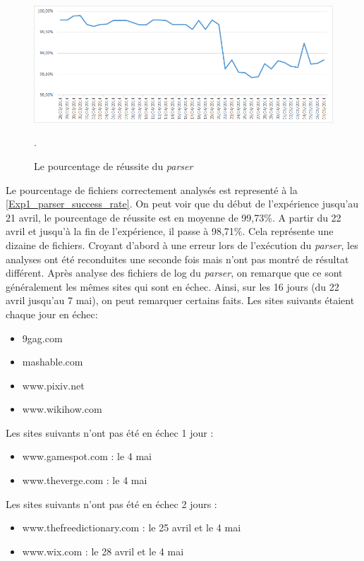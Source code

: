 \begin{figure}[h]
	\centering
	\includegraphics[scale=.8]{graphiques/Exp1_parser_success_rate.png}
	\caption{\label{Exp1_parser_success_rate}Le pourcentage de réussite du \textit{parser}}.
\end{figure}

Le pourcentage de fichiers correctement analysés est representé à la \autoref{Exp1_parser_success_rate}. On peut voir que du début de l'expérience jusqu'au 21 avril, le pourcentage de réussite est en moyenne de 99,73\%. A partir du 22 avril et jusqu'à la fin de l'expérience, il passe à 98,71\%. Cela représente une dizaine de fichiers.
Croyant d'abord à une erreur lors de l'exécution du \textit{parser}, les analyses ont été reconduites une seconde fois mais n'ont pas montré de résultat différent.
Après analyse des fichiers de log du \textit{parser}, on remarque que ce sont généralement les mêmes sites qui sont en échec.
Ainsi, sur les 16 jours (du 22 avril jusqu'au 7 mai), on peut remarquer certains faits.
\newline
Les sites suivants étaient chaque jour en échec:
\begin{itemize}
  \item 9gag.com
  \item mashable.com
  \item www.pixiv.net
  \item www.wikihow.com
  \newline
\end{itemize}
Les sites suivants n'ont pas été en échec 1 jour :
\begin{itemize}
  \item www.gamespot.com : le 4 mai
  \item www.theverge.com : le 4 mai
  \newline
\end{itemize}
Les sites suivants n'ont pas été en échec 2 jours :
\begin{itemize}
  \item www.thefreedictionary.com : le 25 avril et le 4 mai
  \item www.wix.com : le 28 avril et le 4 mai
  \newline
\end{itemize}
